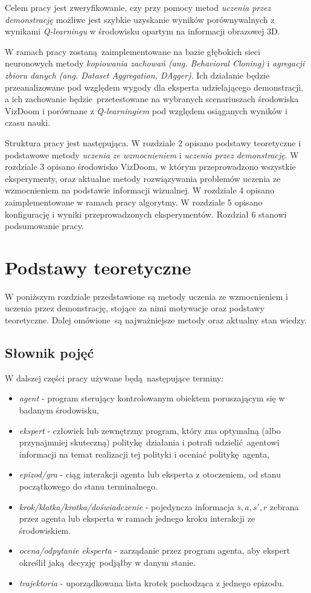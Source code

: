 \documentclass[polish,master,a4paper,oneside]{ppfcmthesis}
\begin{document}
Celem pracy jest zweryfikowanie, czy przy pomocy metod \textit{uczenia przez demonstrację} możliwe jest szybkie uzyskanie wyników porównywalnych z wynikami \textit {Q-learningu} w środowisku opartym na informacji obrazowej 3D.

W ramach pracy zostaną zaimplementowane na bazie głębokich sieci neuronowych metody \textit{kopiowania zachowań (ang. Behavioral Cloning)} i \textit{agregacji zbioru danych (ang. Dataset Aggregation, DAgger)}. Ich działanie będzie przeanalizowane pod względem wygody dla eksperta udzielającego demonstracji, a ich zachowanie będzie przetestowane na wybranych scenariuszach środowiska VizDoom i porównane z \textit {Q-learningiem} pod względem osiąganych wyników i czasu nauki.

Struktura pracy jest następująca. W rozdziale 2 opisano podstawy teoretyczne i podstawowe metody \textit{uczenia ze wzmocnieniem} i \textit{uczenia przez demonstrację}. W rozdziale 3 opisano środowisko VizDoom, w którym przeprowadzono wszystkie eksperymenty, oraz aktualne metody rozwiązywania problemów uczenia ze wzmocnieniem na podstawie informacji wizualnej. W rozdziale 4 opisano zaimplementowane w ramach pracy algorytmy. W rozdziale 5 opisano konfigurację i wyniki przeprowadzonych eksperymentów. Rozdział 6 stanowi podsumowanie pracy.




 \chapter{Podstawy teoretyczne}
W poniższym rozdziale przedstawione są metody uczenia ze wzmocnieniem i uczenia przez demonstrację, stojące za nimi motywacje oraz podstawy teoretyczne. Dalej omówione są najważniejsze metody oraz aktualny stan wiedzy.

\section{Słownik pojęć}

W dalszej części pracy używane będą następujące terminy:

\begin{itemize}
\item \textit{agent} - program sterujący kontrolowanym obiektem poruszającym się w badanym środowisku,
\item \textit{ekspert} - człowiek lub zewnętrzny program, który zna optymalną (albo przynajmniej skuteczną) politykę działania i potrafi udzielić agentowi informacji na temat realizacji tej polityki i oceniać politykę agenta,
\item \textit{epizod/gra} - ciąg interakcji agenta lub eksperta z otoczeniem, od stanu początkowego do stanu terminalnego.
\item \textit{krok/klatka/krotka/doświadczenie} - pojedyncza informacja $s,a,s',r$ zebrana przez agenta lub eksperta w ramach jednego kroku interakcji ze środowiskiem.  
\item \textit{ocena/odpytanie eksperta} - zarządanie przez program agenta, aby ekspert określił jaką decyzję podjąłby w danym stanie.
\item \textit{trajektoria} - uporządkowana lista krotek pochodząca z jednego epizodu.
\end{itemize}
\end{document}

